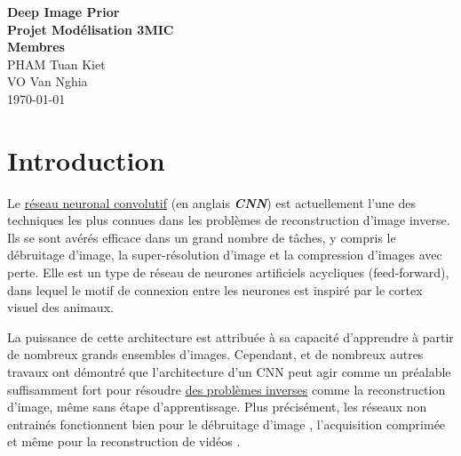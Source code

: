 \documentclass[
  11pt,
  dvipsnames]{article}
\author{}
\date{\vspace{-2.5em}}
\begin{document}
\onehalfspacing


\begin{titlepage}
\vspace*{\fill}
\begin{center}
\LARGE{\textbf{Deep Image Prior}}\\
\Large{\textbf{Projet Modélisation 3MIC}}\\
\vspace*{1\baselineskip}
\Large{\textbf{Membres}}\\
PHAM Tuan Kiet\\
VO Van Nghia\\
\vfill %
\vspace*{\fill}
\today
\end{center}
\end{titlepage}

\newpage

\newpage
{}
\tableofcontents
{}

\listoffigures

\newpage
{}

\hypertarget{introduction}{%
\section{Introduction}\label{introduction}}

Le \protect\hyperlink{ruxe9seau-neuronal-convolutif}{réseau neuronal convolutif} (en anglais \textbf{\emph{CNN}}) est actuellement l'une des techniques
les plus connues dans les problèmes de reconstruction d'image inverse.
Ils se sont avérés efficace dans un grand nombre de tâches, y compris le débruitage d'image,
la super-résolution d'image et la compression d'images avec perte.
Elle est un type de réseau de neurones artificiels acycliques (feed-forward),
dans lequel le motif de connexion entre les neurones est inspiré
par le cortex visuel des animaux.

La puissance de cette architecture est attribuée à sa capacité d'apprendre
à partir de nombreux grands ensembles d'images.
Cependant, \autocite{2007.02471,1711.10925} et de nombreux autres travaux ont démontré
que l'architecture d'un CNN peut agir comme un préalable suffisamment fort pour résoudre
\protect\hyperlink{les-probluxe8mes-inverses}{des problèmes inverses} comme la reconstruction d'image,
même sans étape d'apprentissage. Plus précisément, les réseaux non entrainés
fonctionnent bien pour le débruitage d'image \autocite{2007.02471},
l'acquisition comprimée \autocite{1806.06438} et même pour la reconstruction de vidéos \autocite{1910.01684}.
\end{document}
